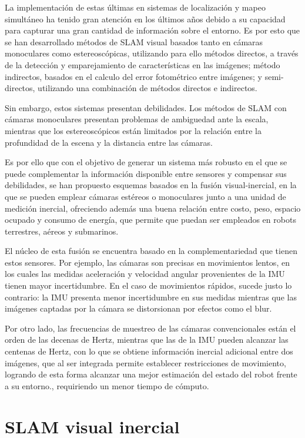 La implementación de estas últimas en sistemas de localización y mapeo simultáneo ha tenido gran atención en los últimos años debido a su capacidad para capturar una gran cantidad de información sobre el entorno. Es por esto que se han desarrollado métodos de SLAM visual basados tanto en cámaras monoculares como estereoscópicas, utilizando para ello métodos directos, a través de la detección y emparejamiento de características en las imágenes; método indirectos, basados en el calculo del error fotométrico entre imágenes; y semi-directos, utilizando una combinación de métodos directos e indirectos.

Sin embargo, estos sistemas presentan debilidades. Los métodos de SLAM con cámaras monoculares presentan problemas de ambiguedad ante la escala, mientras que  los estereoscópicos están limitados por la relación entre la profundidad de la escena y la distancia entre las cámaras. 

Es por ello que con el objetivo de generar un sistema más robusto en el que se puede complementar la información disponible entre sensores y compensar sus debilidades, se han propuesto esquemas basados en la fusión visual-inercial, en la que se pueden emplear cámaras estéreos o monoculares junto a una unidad de medición inercial, ofreciendo además una buena relación entre costo, peso, espacio ocupado y consumo de energía, que permite que puedan ser empleados en robots terrestres, aéreos y submarinos.

El núcleo de esta fusión se encuentra basado en la complementariedad que tienen estos sensores. Por ejemplo, las cámaras son precisas en movimientos lentos, en los cuales las medidas aceleración y velocidad angular provenientes de la IMU tienen mayor incertidumbre. En el caso de movimientos rápidos, sucede justo lo contrario: la IMU presenta menor incertidumbre en sus medidas mientras que las imágenes captadas por la cámara se distorsionan por efectos como el blur. 

Por otro lado,  las frecuencias de muestreo de las cámaras convencionales están el orden de las decenas de Hertz, mientras que las de la IMU pueden alcanzar las centenas de Hertz, con lo que se  obtiene información inercial adicional entre dos imágenes, que al ser integrada permite establecer restricciones de movimiento,  logrando de esta forma alcanzar una mejor estimación del estado del robot frente a su entorno., requiriendo un menor tiempo de cómputo. 



\section{SLAM visual inercial}

